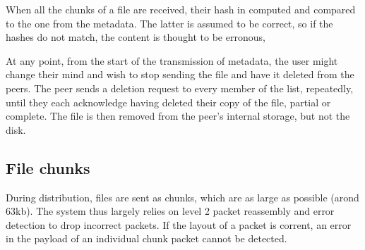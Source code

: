 When all the chunks of a file are received, their hash in computed and compared to the one from the metadata. The latter is assumed to be correct, so if the hashes do not match, the content is thought to be erronous, 

At any point, from the start of the transmission of metadata, the user might change their mind and wish to stop sending the file and have it deleted from the peers. The peer sends a deletion request to every member of the list, repeatedly, until they each acknowledge having deleted their copy of the file, partial or complete. The file is then removed from the peer's internal storage, but not the disk.


\subsection{File chunks}
During distribution, files are sent as chunks, which are as large as possible (arond 63kb). The system thus largely relies on level 2 packet reassembly and error detection to drop incorrect packets. If the layout of a packet is corrent, an error in the payload of an individual chunk packet cannot be detected.
